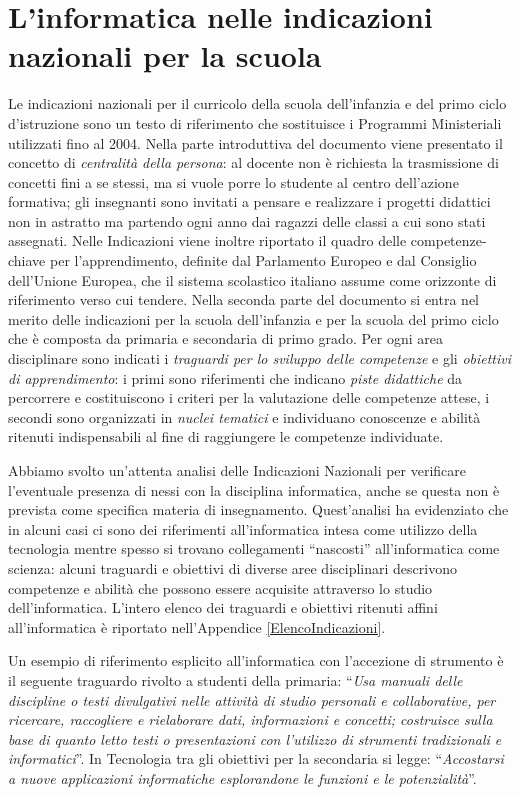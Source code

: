 \documentclass[12pt]{report}
\begin{document}
\section{L'informatica nelle indicazioni nazionali per la scuola}
\label{indicazioni}
Le indicazioni nazionali per il curricolo della scuola dell'infanzia e del primo ciclo d’istruzione \cite{indicazioniNazionali} sono un testo di riferimento che sostituisce i Programmi Ministeriali utilizzati fino al 2004.
Nella parte introduttiva del documento viene presentato il concetto di \textit{centralità della persona}: al docente non è richiesta la trasmissione di concetti fini a se stessi, ma si vuole porre lo studente al centro dell'azione formativa; gli insegnanti sono invitati a pensare e realizzare i progetti didattici non in astratto ma partendo ogni anno dai ragazzi delle classi a cui sono stati assegnati.
Nelle Indicazioni viene inoltre riportato il quadro delle competenze-chiave per l’apprendimento, definite dal Parlamento Europeo e dal Consiglio dell'Unione Europea, che il sistema scolastico italiano assume come orizzonte di riferimento verso cui tendere.
Nella seconda parte del documento si entra nel merito delle indicazioni per la scuola dell'infanzia e per la scuola del primo ciclo che è composta da primaria e secondaria di primo grado.
Per ogni area disciplinare sono indicati i \textit{traguardi per lo sviluppo delle competenze} e gli \textit{obiettivi di apprendimento}: i primi sono riferimenti che indicano \textit{piste didattiche} da percorrere e costituiscono i criteri per la valutazione delle competenze attese, i secondi sono organizzati in \textit{nuclei tematici} e individuano conoscenze e abilità ritenuti indispensabili al fine di raggiungere le competenze individuate.

Abbiamo svolto un'attenta analisi delle Indicazioni Nazionali per verificare l'eventuale presenza di nessi con la disciplina informatica, anche se questa non è prevista come specifica materia di insegnamento.
Quest'analisi ha evidenziato che in alcuni casi ci sono dei riferimenti all'informatica intesa come utilizzo della tecnologia mentre spesso si trovano collegamenti ``nascosti'' all'informatica come scienza: alcuni traguardi e obiettivi di diverse aree disciplinari descrivono competenze e abilità che possono essere acquisite attraverso lo studio dell'informatica.
L'intero elenco dei traguardi e obiettivi ritenuti affini all'informatica è riportato nell'Appendice \ref{ElencoIndicazioni}.

Un esempio di riferimento esplicito all'informatica con l'accezione di strumento è il seguente traguardo rivolto a studenti della primaria: ``\textit{Usa manuali delle discipline o testi divulgativi nelle attività di studio personali e collaborative, per ricercare, raccogliere e rielaborare dati, informazioni e concetti; costruisce sulla base di quanto letto testi o presentazioni con l’utilizzo di strumenti tradizionali e informatici}''. In Tecnologia tra gli obiettivi per la secondaria si legge: ``\textit{Accostarsi a nuove applicazioni informatiche esplorandone le funzioni e le potenzialità}''.
\end{document}
